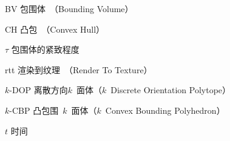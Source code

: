 \begin{denotation}

\item[BV] 包围体~（Bounding Volume）
\item[CH] 凸包~（Convex Hull）
\item[$\tau$] 包围体的紧致程度 
\item[rtt] 渲染到纹理~（Render To Texture）
\item[$k$-DOP] 离散方向$k$~面体（$k$~Discrete Orientation Polytope）
\item[$k$-CBP] 凸包围~$k$~面体（$k$~Convex Bounding Polyhedron）
\item[$t$] 时间
\end{denotation}
